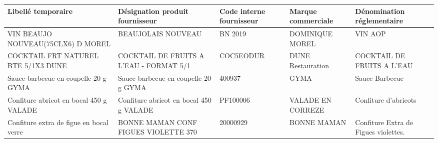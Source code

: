 \begin{tabular}{p{4cm}p{4cm}p{2cm}p{2cm}p{3cm}}
\toprule
                      Libellé temporaire &          Désignation produit fournisseur & Code interne fournisseur & Marque commerciale &            Dénomination réglementaire \\
\midrule
      VIN BEAUJO NOUVEAU(75CLX6) D MOREL &                       BEAUJOLAIS NOUVEAU &                  BN 2019 &    DOMINIQUE MOREL &                              VIN  AOP \\
     COCKTAIL FRT NATUREL BTE 5/1X3 DUNE &  COCKTAIL DE FRUITS A L'EAU - FORMAT 5/1 &                COC5EODUR &  DUNE Restauration &            COCKTAIL DE FRUITS A L'EAU \\
    Sauce barbecue en coupelle 20 g GYMA &     Sauce barbecue en coupelle 20 g GYMA &                   400937 &               GYMA &                        Sauce Barbecue \\
 Confiture abricot en bocal 450 g VALADE &  Confiture abricot en bocal 450 g VALADE &                 PF100006 &  VALADE EN CORREZE &                  Confiture d'abricots \\
 Confiture extra de figue en bocal verre &  BONNE MAMAN CONF FIGUES VIOLETTE    370 &                 20000929 &        BONNE MAMAN &  Confiture Extra de Figues violettes. \\
\bottomrule
\end{tabular}

